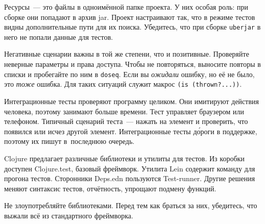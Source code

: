 Ресурсы~--- это файлы в одноимённой папке проекта. У них особая роль: при сборке они
попадают в архив jar. Проект настраивают так, что в режиме тестов видны
дополнительные пути для их поиска. Убедитесь, что при сборке \verb|uberjar| в
него не попали данные для тестов.

Негативные сценарии важны в той же степени, что и позитивные. Проверяйте
неверные параметры и права доступа. Чтобы не повторяться, выносите повторы в
списки и пробегайте по ним в \verb|doseq|. Если вы \emph{ожидали} ошибку, но
её не было, это \emph{тоже} ошибка. Для таких ситуаций служит
макрос \verb|(is (thrown?...))|.

Интеграционные тесты проверяют программу целиком. Они имитируют действия
человека, поэтому занимают больше времени. Тест управляет браузером или
телефоном. Типичный сценарий теста~--- нажать на элемент и проверить, что
появился или исчез другой элемент. Интеграционные тесты д\'{о}роги в поддержке,
поэтому их пишут в~последнюю очередь.

Clojure предлагает различные библиотеки и утилиты для тестов. Из коробки
доступен Clojure.test, базовый фреймворк. Утилита Lein содержит команду для
прогона тестов. Сторонники Deps.edn пользуются Test-runner. Другие решения
меняют синтаксис тестов, отчётность, упрощают подмену функций.

Не злоупотребляйте библиотеками. Перед тем как браться за них, убедитесь, что
выжали всё из стандартного фреймворка.
